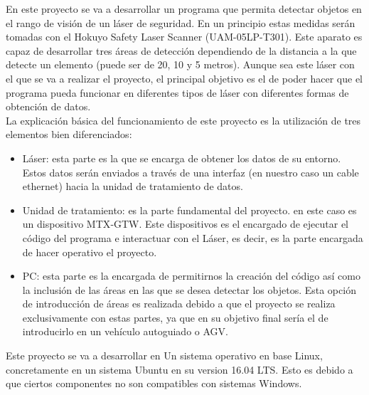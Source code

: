
En este proyecto se va a desarrollar un programa que permita detectar objetos en el rango de visión de un láser de seguridad. En un principio estas medidas serán tomadas con el Hokuyo Safety Laser Scanner (UAM-05LP-T301). Este aparato es capaz de desarrollar tres áreas de detección dependiendo de la distancia a la que detecte un elemento (puede ser de 20, 10 y 5 metros). Aunque sea este láser con el que se va a realizar el proyecto, el principal objetivo es el de poder hacer que el programa pueda funcionar en diferentes tipos de láser con diferentes formas de obtención de datos.\\
La explicación básica del funcionamiento de este proyecto es la utilización de tres elementos bien diferenciados:
\begin{itemize}
    \item Láser: esta parte es la que se encarga de obtener los datos de su entorno. Estos datos serán enviados a través de una interfaz (en nuestro caso un cable ethernet) hacia la unidad de tratamiento de datos.
    \item Unidad de tratamiento: es la parte fundamental del  proyecto. en este caso es un dispositivo MTX‐GTW. Este dispositivos es el encargado de ejecutar el código del programa e interactuar con el Láser, es decir, es la parte encargada de hacer operativo el proyecto.
    \item PC: esta parte es la encargada de permitirnos la creación del código así como la inclusión de las áreas en las que se desea detectar los objetos. Esta opción de introducción de áreas es realizada debido a que el proyecto se realiza exclusivamente con estas partes, ya que en su objetivo final sería el de introducirlo en un vehículo autoguiado o AGV.\\
\end{itemize}
Este proyecto se va a desarrollar en Un sistema operativo en base Linux, concretamente en un sistema Ubuntu en su version 16.04 LTS. Esto es debido a que ciertos componentes no son compatibles con sistemas  Windows.